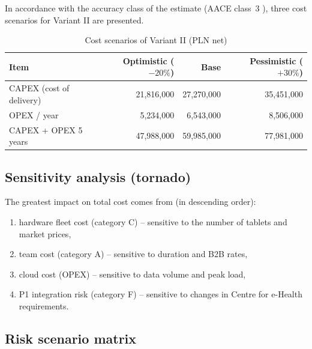 In accordance with the accuracy class of the estimate (AACE class~3 \cite{AACE_18R97}), three cost scenarios for Variant II are presented.

\begin{table}[h]
\centering
\small
\renewcommand{\arraystretch}{1.2}
\begin{tabular}{|L{5.5cm}|r|r|r|}
\hline
{}\textbf{Item} & \textbf{Optimistic ($-20\%$)} & \textbf{Base} & \textbf{Pessimistic ($+30\%$)} \\
\hline
CAPEX (cost of delivery) & 21,816,000 & 27,270,000 & 35,451,000 \\
\hline
OPEX / year & 5,234,000 & 6,543,000 & 8,506,000 \\
\hline
CAPEX + OPEX 5 years & 47,988,000 & 59,985,000 & 77,981,000 \\
\hline
\end{tabular}
\caption{Cost scenarios of Variant II (PLN net)}
\label{tab:scenariusze}
\end{table}

\subsection{Sensitivity analysis (tornado)}

The greatest impact on total cost comes from (in descending order):

\begin{enumerate}
    \item hardware fleet cost (category C) -- sensitive to the number of tablets and market prices,
    \item team cost (category A) -- sensitive to duration and B2B rates,
    \item cloud cost (OPEX) -- sensitive to data volume and peak load,
    \item P1 integration risk (category F) -- sensitive to changes in Centre for e-Health requirements.
\end{enumerate}

\subsection{Risk scenario matrix}

